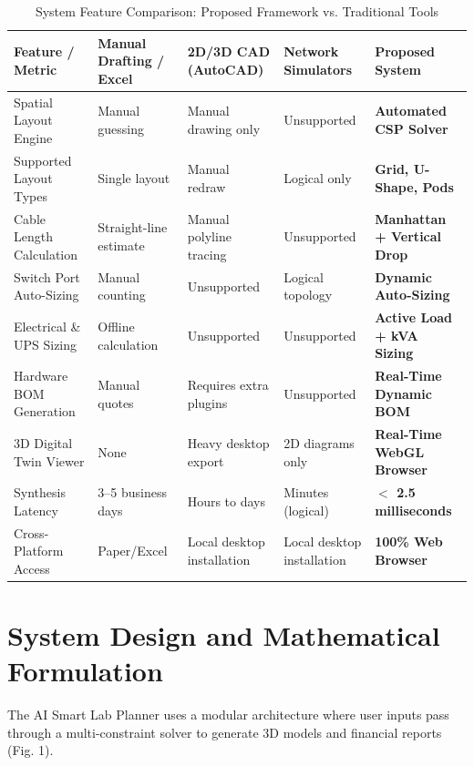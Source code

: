 \documentclass[conference]{IEEEtran}
\begin{document}
\begin{table}[t]
\caption{System Feature Comparison: Proposed Framework vs. Traditional Tools}
\label{tab:comparative_analysis}
\centering
\begin{tabular}{p{4.2cm}p{3.2cm}p{3.2cm}p{3.2cm}p{2.6cm}}
\toprule
\textbf{Feature / Metric} & \textbf{Manual Drafting / Excel} & \textbf{2D/3D CAD (AutoCAD)} & \textbf{Network Simulators} & \textbf{Proposed System} \\
\midrule
Spatial Layout Engine & Manual guessing & Manual drawing only & Unsupported & \textbf{Automated CSP Solver} \\
Supported Layout Types & Single layout & Manual redraw & Logical only & \textbf{Grid, U-Shape, Pods} \\
Cable Length Calculation & Straight-line estimate & Manual polyline tracing & Unsupported & \textbf{Manhattan + Vertical Drop} \\
Switch Port Auto-Sizing & Manual counting & Unsupported & Logical topology & \textbf{Dynamic Auto-Sizing} \\
Electrical \& UPS Sizing & Offline calculation & Unsupported & Unsupported & \textbf{Active Load + kVA Sizing} \\
Hardware BOM Generation & Manual quotes & Requires extra plugins & Unsupported & \textbf{Real-Time Dynamic BOM} \\
3D Digital Twin Viewer & None & Heavy desktop export & 2D diagrams only & \textbf{Real-Time WebGL Browser} \\
Synthesis Latency & 3--5 business days & Hours to days & Minutes (logical) & \textbf{$<$ 2.5 milliseconds} \\
Cross-Platform Access & Paper/Excel & Local desktop installation & Local desktop installation & \textbf{100\% Web Browser} \\
\bottomrule
\end{tabular}
\end{table}

\section{System Design and Mathematical Formulation}
The AI Smart Lab Planner uses a modular architecture where user inputs pass through a multi-constraint solver to generate 3D models and financial reports (Fig. 1).
\end{document}
